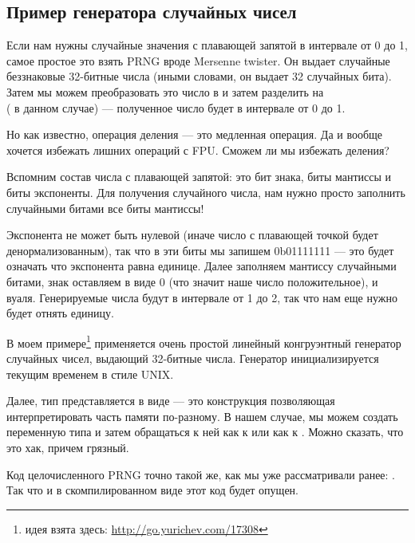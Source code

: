 \subsection{Пример генератора случайных чисел}
\label{FPU_PRNG}

Если нам нужны случайные значения с плавающей запятой в интервале от 0 до 1, самое простое это взять
\ac{PRNG} вроде Mersenne twister.
Он выдает случайные беззнаковые 32-битные числа (иными словами, он выдает 32 случайных бита).
Затем мы можем преобразовать это число в \Tfloat и затем разделить на \\
 ( в данном случае) --- полученное число будет в интервале от 0 до 1.

Но как известно, операция деления --- это медленная операция. 
Да и вообще хочется избежать лишних операций с FPU.
Сможем ли мы избежать деления?

Вспомним состав числа с плавающей запятой: это бит знака, биты мантиссы и биты экспоненты. 
Для получения случайного числа, нам нужно просто заполнить случайными битами все биты мантиссы!

Экспонента не может быть нулевой (иначе число с плавающей точкой будет денормализованным), 
так что в эти биты мы запишем 0b01111111 --- это будет означать что экспонента равна единице.
Далее заполняем мантиссу случайными битами, знак оставляем в виде 0 (что значит наше число положительное), и вуаля.
Генерируемые числа будут в интервале от 1 до 2, так что нам еще нужно будет отнять единицу.

\newcommand{\URLXOR}{\url{http://go.yurichev.com/17308}}

В моем примере\footnote{идея взята здесь: \URLXOR} 
применяется очень простой линейный конгруэнтный генератор случайных чисел, выдающий 32-битные числа.
Генератор инициализируется текущим временем в стиле UNIX.

Далее, тип \Tfloat представляется в виде  --- это конструкция \CCpp позволяющая 
интерпретировать часть памяти по-разному. В нашем случае, мы можем создать переменную типа  
и затем обращаться к ней как к \Tfloat или как к . Можно сказать, что это хак, причем грязный.


Код целочисленного \ac{PRNG} точно такой же, как мы уже рассматривали ранее: .
Так что и в скомпилированном виде этот код будет опущен.



